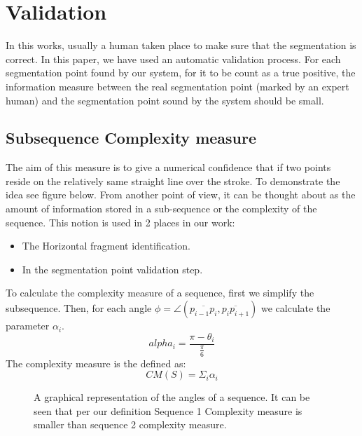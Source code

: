 \documentclass[journal,compsoc]{IEEEtran}
\begin{document}
\section{Validation}
In this works, usually a human taken place to make sure that the segmentation is correct. In this paper, we have used an automatic validation process. For each segmentation point found by our system, for it to be count as a true positive, the information measure between the real segmentation point (marked by an expert human) and the segmentation point sound by the system should be small.

\subsection{Subsequence Complexity measure }
The aim of this measure is to give a numerical confidence that if two points reside on the relatively same straight line over the stroke. To demonstrate the idea see figure below. From another point of view, it can be thought about as the amount of information stored in a sub-sequence or the complexity of the sequence. This notion is used in 2 places in our work:
\begin{itemize}
\item The Horizontal fragment identification.
\item In the segmentation point validation step.
\end{itemize}

To calculate the complexity measure of a sequence, first we simplify the subsequence. Then, for each angle  $\phi=\angle(\overline{p_{i-1}p_{i}},\overline{p_{i}p_{i+1}})$ we calculate the parameter $\alpha_{i}$.
\begin{equation}
 alpha_{i}=\frac{\pi-\theta_{i}}{\frac{\pi}{6}}
\end{equation}
The complexity measure is the defined as:
\begin{equation}
CM(S)=\Sigma_{i}\alpha_{i}
\end{equation}

\begin{figure}[h]
     \begin{center}
    \end{center}
    \caption{A graphical representation of the angles of a sequence. It can be seen that per our definition Sequence 1 Complexity measure is smaller than sequence 2 complexity measure.}
   \label{fig:sequence_complexity}
\end{figure}
\end{document}
